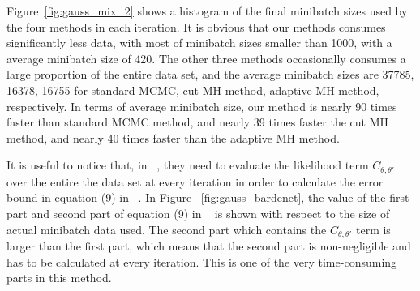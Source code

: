 \documentclass{article}
\begin{document}
Figure~\ref{fig:gauss_mix_2} shows a histogram of the final minibatch sizes used by
the four methods in each iteration. It is obvious that our methods consumes significantly less data, with most of minibatch sizes smaller than 1000, with a average minibatch size of 420. The other three methods occasionally consumes a large proportion of the entire data set, and the average minibatch sizes are 37785, 16378, 16755 for standard MCMC, cut MH method, adaptive MH method, respectively. In terms of average minibatch size, our method is nearly 90 times faster than standard MCMC method, and nearly 39 times faster the cut MH method, and nearly 40 times faster than the adaptive MH method. 

It is useful to notice that, in ~\cite{icml2014c1_bardenet14}, they need to evaluate the likelihood term $C_{\theta,\theta'}$ over the entire the data set at every iteration in order to calculate the error bound in equation (9) in ~\cite{icml2014c1_bardenet14}. In Figure ~\ref{fig:gauss_bardenet}, the value of the first part and second part of equation (9) in ~\cite{icml2014c1_bardenet14} is shown with respect to the size of actual minibatch data used. The second part which contains  the $C_{\theta,\theta'}$ term is larger than the first part, which means that the second part is non-negligible and has to be calculated at every iteration. This is one of the very time-consuming parts in this method. 

\end{document}
